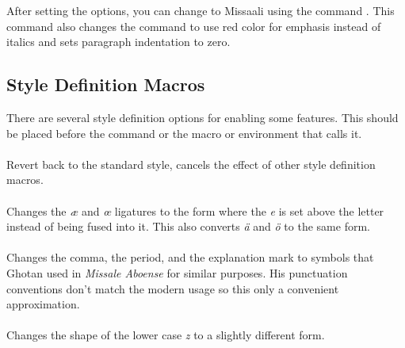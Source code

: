 \documentclass[a4paper, 12pt]{article}
\begin{document}
After setting the options, you can change to Missaali using the
command . This command also changes the
 command to use red color for emphasis instead of
italics and sets paragraph indentation to zero.

\subsection{Style Definition Macros}

There are several style definition options for enabling some features.
This should be placed before the  command or the
macro or environment that calls it. 

\paragraph{}

Revert back to the standard style, cancels the effect of other style
definition macros. 

\paragraph{}

Changes the \emph{æ} and \emph{œ} ligatures to the form where the
\emph{e} is set above the letter instead of being fused into it. This
also converts \emph{ä} and \emph{ö} to the same form. 

\paragraph{}

Changes the comma, the period, and the explanation mark to symbols
that Ghotan used in \emph{Missale Aboense} for similar purposes. His
punctuation conventions don't match the modern usage so this only a
convenient approximation.

\paragraph{}

Changes the shape of the lower case \emph{z} to a slightly different
form.

\paragraph{}
\end{document}

